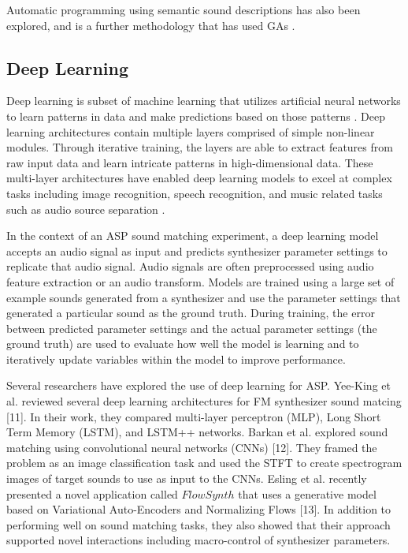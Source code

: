 Automatic programming using semantic sound descriptions has also been explored, and is a further methodology that has used GAs \cite{krekovic2016algorithm}.

\subsection{Deep Learning}
Deep learning is subset of machine learning that utilizes artificial neural networks to learn patterns in data and make predictions based on those patterns \cite{lecun2015deep}. Deep learning architectures contain multiple layers comprised of simple non-linear modules. Through iterative training, the layers are able to extract features from raw input data and learn intricate patterns in high-dimensional data. These multi-layer architectures have enabled deep learning models to excel at complex tasks including image recognition, speech recognition, and music related tasks such as audio source separation \cite{spleeter2019}.

In the context of an ASP sound matching experiment, a deep learning model accepts an audio signal as input and predicts synthesizer parameter settings to replicate that audio signal. Audio signals are often preprocessed using audio feature extraction or an audio transform. Models are trained using a large set of example sounds generated from a synthesizer and use the parameter settings that generated a particular sound as the ground truth. During training, the error between predicted parameter settings and the actual parameter settings (the ground truth) are used to evaluate how well the model is learning and to iteratively update variables within the model to improve performance. 

Several researchers have explored the use of deep learning for ASP. Yee-King et al. reviewed several deep learning architectures for FM synthesizer sound matcing [11]. In their work, they compared multi-layer perceptron (MLP), Long Short Term Memory (LSTM), and LSTM++ networks. Barkan et al. explored sound matching using convolutional neural networks (CNNs) [12]. They framed the problem as an image classification task and used the STFT to create spectrogram images of target sounds to use as input to the CNNs. Esling et al. recently presented a novel application called $FlowSynth$ that uses a generative model based on Variational Auto-Encoders and Normalizing Flows [13]. In addition to performing well on sound matching tasks, they also showed that their approach supported novel interactions including macro-control of synthesizer parameters.

